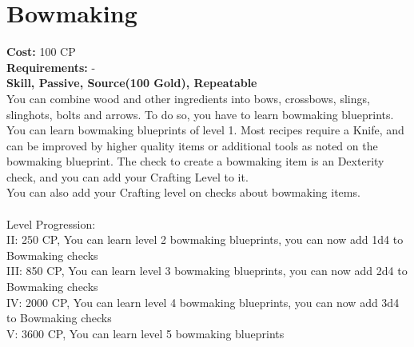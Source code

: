 \section{Bowmaking}\label{perk:bowmaking}
\textbf{Cost:} 100 CP\\
\textbf{Requirements:} -\\
\textbf{Skill, Passive, Source(100 Gold), Repeatable}\\
You can combine wood and other ingredients into bows, crossbows, slings, slinghots, bolts and arrows.
To do so, you have to learn bowmaking blueprints.
You can learn bowmaking blueprints of level 1.
Most recipes require a Knife, and can be improved by higher quality items or additional tools as noted on the bowmaking blueprint.
The check to create a bowmaking item is an Dexterity check, and you can add your Crafting Level to it.\\
You can also add your Crafting level on checks about bowmaking items.\\
\\
Level Progression:\\
II: 250 CP, You can learn level 2 bowmaking blueprints, you can now add 1d4 to Bowmaking checks\\
III: 850 CP, You can learn level 3 bowmaking blueprints, you can now add 2d4 to Bowmaking checks\\
IV: 2000 CP, You can learn level 4 bowmaking blueprints, you can now add 3d4 to Bowmaking checks\\
V: 3600 CP, You can learn level 5 bowmaking blueprints\\